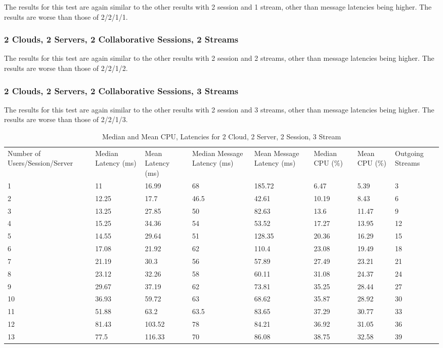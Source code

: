 The results for this test are again similar to the other results with 2 session and 1 stream, other than message latencies being higher. The results are worse than those of 2/2/1/1.

\subsubsection{2 Clouds, 2 Servers, 2 Collaborative Sessions, 2 Streams}

The results for this test are again similar to the other results with 2 session and 2 streams, other than message latencies being higher. The results are worse than those of 2/2/1/2.

\subsubsection{2 Clouds, 2 Servers, 2 Collaborative Sessions, 3 Streams}

The results for this test are again similar to the other results with 2 session and 3 streams, other than message latencies being higher. The results are worse than those of 2/2/1/3.

\begin{table}
\caption{Median and Mean CPU, Latencies for 2 Cloud, 2 Server, 2 Session, 3 Stream}
\label{table:2cld_2serv_2sess_3str}
\begin{tabu} to\linewidth{|X[c]|X[c]|X[c]|X[c]|X[c]|X[c]|X[c]|X[c]|}
\everyrow{\hline}
\hline
Number of Users/Session/Server & Median Latency (ms) & Mean Latency (ms) & Median Message Latency (ms) & Mean Message Latency (ms) & Median CPU (\%) & Mean CPU (\%) & Outgoing Streams\\
1 & 11 & 16.99 & 68 & 185.72 & 6.47 & 5.39 & 3 \\
2 & 12.25 & 17.7 & 46.5 & 42.61 & 10.19 & 8.43 & 6 \\
3 & 13.25 & 27.85 & 50 & 82.63 & 13.6 & 11.47 & 9 \\
4 & 15.25 & 34.36 & 54 & 53.52 & 17.27 & 13.95 & 12 \\
5 & 14.55 & 29.64 & 51 & 128.35 & 20.36 & 16.29 & 15 \\
6 & 17.08 & 21.92 & 62 & 110.4 & 23.08 & 19.49 & 18 \\
7 & 21.19 & 30.3 & 56 & 57.89 & 27.49 & 23.21 & 21 \\
8 & 23.12 & 32.26 & 58 & 60.11 & 31.08 & 24.37 & 24 \\
9 & 29.67 & 37.19 & 62 & 73.81 & 35.25 & 28.44 & 27 \\
10 & 36.93 & 59.72 & 63 & 68.62 & 35.87 & 28.92 & 30 \\
11 & 51.88 & 63.2 & 63.5 & 83.65 & 37.29 & 30.77 & 33 \\
12 & 81.43 & 103.52 & 78 & 84.21 & 36.92 & 31.05 & 36 \\
13 & 77.5 & 116.33 & 70 & 86.08 & 38.75 & 32.58 & 39 \\
\end{tabu}
\end{table}

